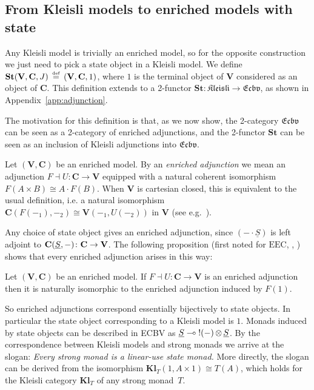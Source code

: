 \documentclass{LMCS}
\newcommand{\co}{\colon}
\newcommand{\tensor}{\otimes}
\newcommand{\ltensortype}[2]{{!} #1 \, {\tensor} \, #2}
\newcommand{\EEC}{\mathrm{EEC}}
\newcommand{\ECBV}{ECBV}
\newcommand{\VCat}{\fixedcatfont{V}} \newcommand{\CCat}{\fixedcatfont{C}} \newcommand{\DCat}{\fixedcatfont{D}}
\newcommand{\ltensor}[2]{#1 \cdot #2}
\newcommand{\fixedcatfont}{\mathbf}
\newcommand{\iso}{\cong}
\newcommand{\SA}{A}
\newcommand{\SB}{B}
\newcommand{\stateobj}{{\underline{S}}}
\newcommand{\CATECBV}{\TwoCatFont{Ecbv}}
\newcommand{\Freyd}{\TwoCatFont{Kleisli}}
\newcommand{\FreydToECBV}{\mathbf{St}}
\newcommand{\KlCat}[3]{\mathbf{Kl}_{#3}} \newcommand{\Klltensor}[2]{#1 \cdot_{\mathbf{Kl}} #2}
\newcommand{\TwoCatFont}[1]{\mathfrak{#1}}
\newcommand{\lradj}[2]{{#1} \dashv {#2}}
\newcommand{\eqdef}{\defeq}
\newcommand{\defeq}{\mathrel{\,\stackrel{\mbox{\tiny{$\mathrm{def}$}}}=\,}}
\begin{document}
\subsection{From Kleisli models to enriched models with state}
\label{sec:kleisli-to-enriched-models}
Any Kleisli model is trivially an enriched model, so for the opposite
construction we just need to pick a state object in a Kleisli
model. We define $\FreydToECBV(\VCat, \CCat, J) \eqdef (\VCat, \CCat,
1)$, where $1$ is the terminal object of $\VCat$ considered 
as an object of $\CCat$.
This definition
extends to a 2-functor $\FreydToECBV \co \Freyd \to \CATECBV$,
as shown in Appendix~\ref{app:adjunction}.

The motivation for this definition is that, as we now show, the 2-category $\CATECBV$ can be seen as a 
2-category of enriched adjunctions, and the 2-functor $\FreydToECBV$ can be seen as an inclusion of
Kleisli adjunctions into $\CATECBV$. 

Let $(\VCat, \CCat)$ be an enriched model. By an \emph{enriched adjunction} we mean 
an adjunction $\lradj{F}{U} \co \CCat \to \VCat$ equipped with a natural 
coherent isomorphism
$F(\SA\times\SB)\iso\ltensor{\SA}{F(\SB)}$.
When $\VCat$ is cartesian closed, this is equivalent to
the usual definition, i.e. a natural isomorphism
${\CCat(F(-_1),-_2)\iso \VCat(-_1,U(-_2))}$ in $\VCat$ (see e.g.~\cite{kelly-enrichedadj}). 

Any choice of state object gives an enriched adjunction,
since
${(\ltensor -\stateobj)}$ 
is left adjoint to  ${\CHom\stateobj-\colon \CCat\to\VCat}$.
The following proposition (first noted for $\EEC$, \cite[Proof of Thm.~4]{Mogelberg:CSL:09}, \cite{EEC:journal}) shows that every enriched adjunction arises in this way:
\begin{prop}
\label{prop:adjmodels}
Let $(\VCat,\CCat)$ be an enriched model.
If ${F\dashv U\colon \CCat\to\VCat}$ is an enriched adjunction
then it is naturally isomorphic to
the enriched adjunction induced by $F(1)$.
\end{prop}
So enriched adjunctions correspond essentially bijectively 
to state objects.
In particular the state object corresponding to a Kleisli model is $1$. 
Monads induced by state objects can be described in {\ECBV} as $\stateobj \lpop \ltensortype{(-)}{\stateobj}$.
By the correspondence between Kleisli models and strong monads we arrive at the slogan: 
\emph{Every strong monad is a linear-use state monad.} 
More directly, the slogan can be derived from the 
isomorphism $\KlCat{}{} T(1,\SA\times 1)\cong T(\SA)$, which holds for 
the Kleisli category $\KlCat{}{}T$ of any strong monad~$T$. 
\end{document}
